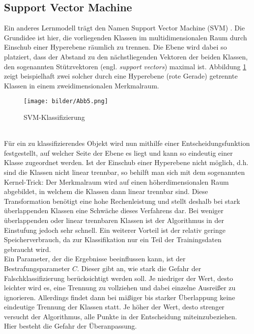 \subsection{Support Vector Machine}\label{svm}
Ein anderes Lernmodell trägt den Namen Support Vector Machine (SVM) \citep{Nayak15}. Die Grundidee ist hier, die vorliegenden Klassen im multidimensionalen Raum durch Einschub einer Hyperebene räumlich zu trennen. Die Ebene wird dabei so platziert, dass der Abstand zu den nächstliegenden Vektoren der beiden Klassen, den sogenannten Stützvektoren (engl. \textit{support vectors}) maximal ist. Abbildung \ref{svm-alg} zeigt beispielhaft zwei solcher durch eine Hyperebene (rote Gerade) getrennte Klassen in einem zweidimensionalen Merkmalraum. 
\begin{figure}[htb]
	\begin{center}
		\texttt{[image: bilder/Abb5.png]}
		\caption{SVM-Klassifizierung \citep{Zhou16}}\label{svm-alg}
	\end{center}
\end{figure}\\
 Für ein zu klassifizierendes Objekt wird nun mithilfe einer Entscheidungsfunktion festgestellt, auf welcher Seite der Ebene es liegt und kann so eindeutig einer Klasse zugeordnet werden. Ist der Einschub einer Hyperebene nicht möglich, d.h. sind die Klassen nicht linear trennbar, so behilft man sich mit dem sogenannten \glqq Kernel-Trick\grqq{}: Der Merkmalraum wird auf einen höherdimensionalen Raum abgebildet, in welchem die Klassen dann linear trennbar sind. Diese Transformation benötigt eine hohe Rechenleistung und stellt deshalb bei stark überlappenden Klassen eine Schwäche dieses Verfahrens dar. Bei weniger überlappenden oder linear trennbaren Klassen ist der Algorithmus in der Einstufung jedoch sehr schnell. Ein weiterer Vorteil ist der relativ geringe Speicherverbrauch, da zur Klassifikation nur ein Teil der Trainingsdaten gebraucht wird.\\
 Ein Parameter, der die Ergebnisse beeinflussen kann, ist der Bestrafungsparameter $C$. Dieser gibt an, wie stark die Gefahr der Falschklassifizierung berücksichtigt werden soll. Je niedriger der Wert, desto leichter wird es, eine Trennung zu vollziehen und dabei einzelne Ausreißer zu ignorieren. Allerdings findet dann bei mäßiger bis starker Überlappung keine eindeutige Trennung der Klassen statt. Je höher der Wert, desto strenger versucht der Algorithmus, alle Punkte in der Entscheidung miteinzubeziehen. Hier besteht die Gefahr der Überanpassung.
